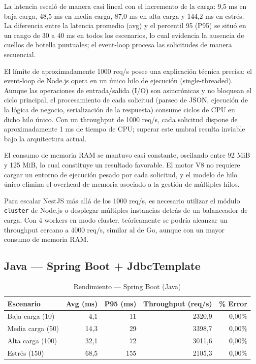 \documentclass[12pt,a4paper]{article}
\begin{document}
La latencia escaló de manera casi lineal con el incremento de la carga: 9,5 ms en baja carga, 48,5 ms en media carga, 87,0 ms en alta carga y 144,2 ms en estrés. La diferencia entre la latencia promedio (avg) y el percentil 95 (P95) se situó en un rango de 30 a 40 ms en todos los escenarios, lo cual evidencia la ausencia de cuellos de botella puntuales; el event-loop procesa las solicitudes de manera secuencial.

El límite de aproximadamente 1000 req/s posee una explicación técnica precisa: el event-loop de Node.js opera en un único hilo de ejecución (single-threaded). Aunque las operaciones de entrada/salida (I/O) son asincrónicas y no bloquean el ciclo principal, el procesamiento de cada solicitud (parseo de JSON, ejecución de la lógica de negocio, serialización de la respuesta) consume ciclos de CPU en dicho hilo único. Con un throughput de 1000 req/s, cada solicitud dispone de aproximadamente 1 ms de tiempo de CPU; superar este umbral resulta inviable bajo la arquitectura actual.

El consumo de memoria RAM se mantuvo casi constante, oscilando entre 92 MiB y 125 MiB, lo cual constituye un resultado favorable. El motor V8 no requiere cargar un entorno de ejecución pesado por cada solicitud, y el modelo de hilo único elimina el overhead de memoria asociado a la gestión de múltiples hilos.

Para escalar NestJS más allá de los 1000 req/s, es necesario utilizar el módulo \texttt{cluster} de Node.js o desplegar múltiples instancias detrás de un balanceador de carga. Con 4 workers en modo cluster, teóricamente se podría alcanzar un throughput cercano a 4000 req/s, similar al de Go, aunque con un mayor consumo de memoria RAM.

\subsection{Java --- Spring Boot + JdbcTemplate}

\begin{table}[h]
\centering
\small
\begin{tabular}{lrrrr}
\toprule
\textbf{Escenario} & \textbf{Avg (ms)} & \textbf{P95 (ms)} & \textbf{Throughput (req/s)} & \textbf{\% Error} \\
\midrule
Baja carga (10)  & 4,1  & 11  & 2320,9 & 0,00\% \\
Media carga (50) & 14,3 & 29  & 3398,7 & 0,00\% \\
Alta carga (100) & 32,1 & 72  & 3011,6 & 0,00\% \\
Estrés (150)     & 68,5 & 155 & 2105,3 & 0,00\% \\
\bottomrule
\end{tabular}
\caption{Rendimiento --- Spring Boot (Java)}
\end{table}
\end{document}
